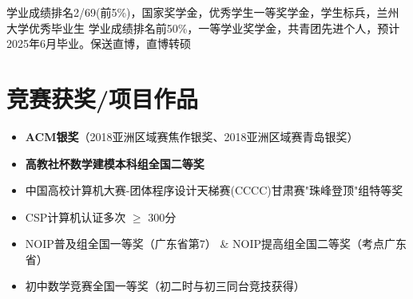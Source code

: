 \documentclass{resume}
\begin{document}
学业成绩排名2/69(前5\%)，国家奖学金，优秀学生一等奖学金，学生标兵，兰州大学优秀毕业生
学业成绩排名前50\%，一等学业奖学金，共青团先进个人，预计2025年6月毕业。保送直博，直博转硕




\section{竞赛获奖/项目作品}
\begin{itemize}[parsep=0.2ex]
  \item \textbf{ACM银奖}（2018亚洲区域赛焦作银奖、2018亚洲区域赛青岛银奖）
  \item \textbf{高教社杯数学建模本科组全国二等奖}
  \item 中国高校计算机大赛-团体程序设计天梯赛(CCCC)甘肃赛"珠峰登顶"组特等奖
  \item CSP计算机认证多次 $\geq$ 300分
  \item NOIP普及组全国一等奖（广东省第7） \& NOIP提高组全国二等奖（考点广东省）
  \item 初中数学竞赛全国一等奖（初二时与初三同台竞技获得）
  
\end{itemize}


\end{document}
